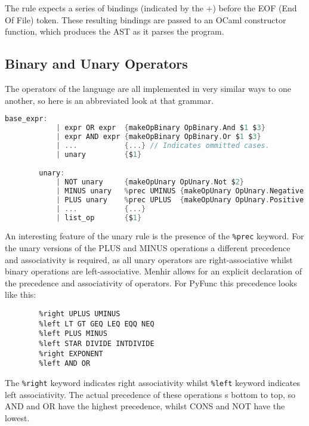 \documentclass{l4proj}
\begin{document}
    The rule expects a series of bindings (indicated by the $+$) before the EOF (End Of File) token.
    These resulting bindings are passed to an OCaml constructor function, which produces the AST as it parses the program.

\subsection*{Binary and Unary Operators}
    
    The operators of the language are all implemented in very similar ways to one another, so here is an abbreviated look at that grammar.
    \begin{lstlisting}[language=C, keepspaces=true, caption=An abrreviated version of PyFunc Parser's implementation of binary and unary operators.]
        base_expr:
            | expr OR expr  {makeOpBinary OpBinary.And $1 $3}
            | expr AND expr {makeOpBinary OpBinary.Or $1 $3}
            | ...           {...} // Indicates ommitted cases.
            | unary         {$1}

        unary:
            | NOT unary     {makeOpUnary OpUnary.Not $2}
            | MINUS unary   %prec UMINUS {makeOpUnary OpUnary.Negative $2}
            | PLUS unary    %prec UPLUS  {makeOpUnary OpUnary.Positive $2}
            | ...           {...}
            | list_op       {$1}
    \end{lstlisting}

    An interesting feature of the unary rule is the presence of the \texttt{\%prec} keyword.
    For the unary versions of the PLUS and MINUS operations a different precedence and associativity is required, as all unary operators are right-associative whilst binary operations are left-associative.
    Menhir allows for an explicit declaration of the precedence and associativity of operators.
    \newpage
    For PyFunc this precedence looks like this:
    \begin{lstlisting}[caption=PyFunc's Menhir precedence and associativity declarations.]
        %right CONS NOT
        %right UPLUS UMINUS
        %left LT GT GEQ LEQ EQQ NEQ
        %left PLUS MINUS
        %left STAR DIVIDE INTDIVIDE
        %right EXPONENT
        %left AND OR
    \end{lstlisting}
    The \texttt{\%right} keyword indicates right associativity whilst \texttt{\%left} keyword indicates left associativity.
    The actual precedence of these operations s bottom to top, so AND and OR have the highest precedence, whilst CONS and NOT have the lowest.
\end{document}
